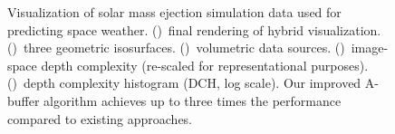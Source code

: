 \documentclass{egpubl}
\newcommand{\ab}{\mbox{A-buffer}}
\newlength{\boxheight}
\begin{document}
\begin{figure}[p]
\begin{minipage}[b][\boxheight][b]{0.24\linewidth}
\begin{minipage}[b]{0.98\linewidth}
    \end{minipage}%
  \end{minipage}%
  \caption{\label{fig:space}%
    Visualization of solar mass ejection simulation data used for predicting space weather. 
    ()~final rendering of hybrid visualization.
    ()~three geometric isosurfaces.
    ()~volumetric data sources. %
    ()~image-space depth complexity (re-scaled for representational purposes). 
    ()~depth complexity histogram (DCH, log scale).
    Our improved \ab{} algorithm achieves up to three times the performance compared to existing approaches. %
  }
\end{figure}
\end{document}
